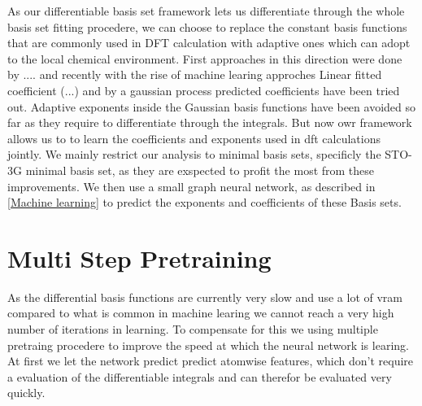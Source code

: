 As our differentiable basis set framework lets us differentiate through the whole basis set fitting procedere, we can choose to replace the constant basis functions that are commonly used in DFT calculation with adaptive ones which can adopt to the local chemical environment. First approaches in this direction were done by .... and recently with the rise of machine learing approches Linear fitted coefficient (...) and by a gaussian process predicted coefficients have been tried out. Adaptive exponents inside the Gaussian basis functions have been avoided so far as they require to differentiate through the integrals. But now owr framework allows us to to learn the coefficients and exponents used in dft calculations jointly. We mainly restrict our analysis to minimal basis sets, specificly the STO-3G\cite{STO-3G} minimal basis set, as they are exspected to profit the most from these improvements. We then use a small graph neural network, as described in \ref{Machine learning} to predict the exponents and coefficients of these Basis sets.
\section{Multi Step Pretraining}
As the differential basis functions are currently very slow and use a lot of vram compared to what is common in machine learing we cannot reach a very high number of iterations in learning. To compensate for this we using multiple pretraing procedere to improve the speed at which the neural network is learing. At first we let the network predict predict atomwise features, which don't require a evaluation of the differentiable integrals and can therefor be evaluated very quickly.
